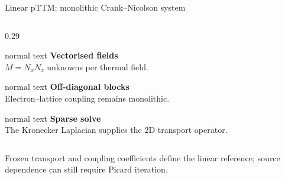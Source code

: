 \documentclass[aspectratio=169,10pt]{beamer}
\begin{document}
\begin{frame}[t]{Linear pTTM: monolithic Crank--Nicolson system}
\begin{columns}[T,totalwidth=0.96\textwidth]
\begin{column}{0.29\textwidth}
\begin{beamercolorbox}[wd=\linewidth,sep=0.46em]{normal text}
        \scriptsize
        \textbf{\color{GVTeal}Vectorised fields}\\
        \(M=N_xN_z\) unknowns per thermal field.
      \end{beamercolorbox}
      \vspace{0.10cm}
      \begin{beamercolorbox}[wd=\linewidth,sep=0.46em]{normal text}
        \scriptsize
        \textbf{\color{GVCouplingOrange}Off-diagonal blocks}\\
        Electron--lattice coupling remains monolithic.
      \end{beamercolorbox}
      \vspace{0.10cm}
      \begin{beamercolorbox}[wd=\linewidth,sep=0.46em]{normal text}
        \scriptsize
        \textbf{\color{GVDiffusionGreen}Sparse solve}\\
        The Kronecker Laplacian supplies the 2D transport operator.
      \end{beamercolorbox}
    \end{column}
  \end{columns}
  \vspace{0.12cm}
  \begin{center}
    \scriptsize\color{GVSlate}
    Frozen transport and coupling coefficients define the linear reference; source dependence can still require Picard iteration.
  \end{center}
\end{frame}
\end{document}
